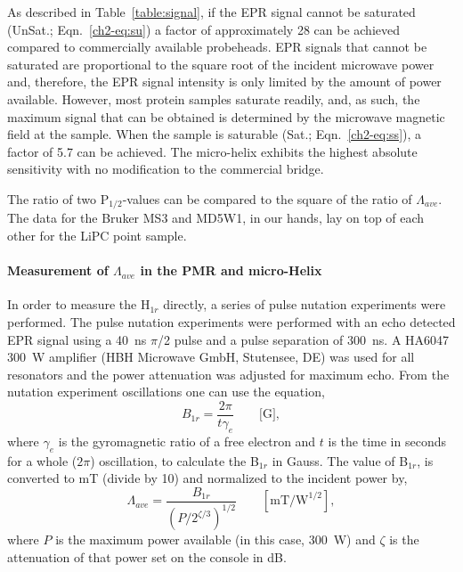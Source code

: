 As described in Table~\ref{table:signal}, if the EPR signal cannot be saturated (UnSat.; Eqn.~\ref{ch2-eq:su}) a factor of approximately 28 can be achieved compared to commercially available probeheads. EPR signals that cannot be saturated are proportional to the square root of the incident microwave power and, therefore, the EPR signal intensity is only limited by the amount of power available. However, most protein samples saturate readily, and, as such, the maximum signal that can be obtained is determined by the microwave magnetic field at the sample. When the sample is saturable (Sat.; Eqn.~\ref{ch2-eq:ss}), a factor of 5.7 can be achieved. The micro-helix exhibits the highest absolute sensitivity with no modification to the commercial bridge. 

The ratio of two P$_{1/2}$-values can be compared to the square of the ratio of $\Lambda_{ave}$. The data for the Bruker MS3 and MD5W1, in our hands, lay on top of each other for the LiPC point sample.

\paragraph{Measurement of $\Lambda_{ave}$ in the PMR and micro-Helix}
In order to measure the H$_{1r}$ directly, a series of pulse nutation experiments were performed. \cite{schweiger2001principles} The pulse nutation experiments were performed with an echo detected EPR signal using a 40~ns $\pi$/2 pulse and a pulse separation of 300~ns. A HA6047 300~W amplifier (HBH Microwave GmbH, Stutensee, DE) was used for all resonators and the power attenuation was adjusted for maximum echo. From the nutation experiment oscillations one can use the equation,
\begin{equation}
 B_{1r} = \frac{2 \pi}{t \gamma_e} \qquad \text{[G]},
\end{equation}
where $\gamma_e$ is the gyromagnetic ratio of a free electron and $t$ is the time in seconds for a whole ($2\pi$) oscillation, to calculate the  B$_{1r}$ in Gauss. The value of B$_{1r}$, is converted to mT (divide by 10) and normalized to the incident power by,
\begin{equation}
\Lambda_{ave} = \frac{B_{1r}}{(P/2^{\zeta/3})^{1/2}}\qquad [\text{mT/W}^{1/2}],
\end{equation}
where $P$ is the maximum power available (in this case, 300~W) and $\zeta$ is the attenuation of that power set on the console in dB. 

